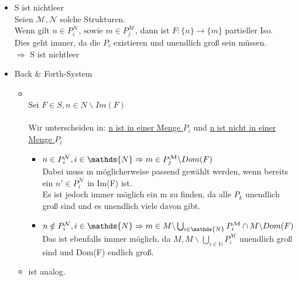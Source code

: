 \documentclass[a4paper]{scrartcl}%
\begin{document}
\begin{itemize}
            \begin{itemize}
                \item S ist nichtleer\\
                    Seien $\mathcal{M}, \mathcal{N}$ solche Strukturen.\\
                    Wenn gilt $n \in P_i^\mathcal{N} \text{, sowie } m \in P_j^\mathcal{M}$, dann ist $F: \{n\} \rightarrow \{m\}$ partieller Iso.\\
                    Dies geht immer, da die $P_i$ existieren und unendlich groß sein müssen.\\
                    $\Rightarrow$ S ist nichtleer\\
                \item Back \& Forth-System\\
                    \begin{itemize}
                        \item {}\\
                            Sei $F \in S, n \in N\backslash Im(F)$\\
                            \\Wir unterscheiden in: \underline{n ist in einer Menge $P_i$} und \underline{n ist nicht in einer Menge $P_i$}\\
                            \begin{itemize}
                                \item $n \in P_i^\mathcal{N}, i \in \mathds{N}\\
                                    \Rightarrow m \in P_j^\mathcal{M} \backslash Dom(F)$\\
                                    Dabei muss m möglicherweise passend gewählt werden, wenn bereits ein $n' \in P_i^\mathcal{N}$ in Im(F) ist.\\
                                    Es ist jedoch immer möglich ein m zu finden, da alle $P_k$ unendlich groß sind und es unendlich viele davon gibt.\\
                                \item $n \notin P_i^\mathcal{N}, i \in \mathds{N}\\
                                    \Rightarrow m \in M \backslash \bigcup_{i \in \mathds{N}}P_i^\mathcal{M} \cap M \backslash Dom(F)$\\
                                    Das ist ebenfalls immer möglich, da $M, M \backslash \bigcup_{i \in \mathds{N}}P_i^\mathcal{M}$ unendlich groß sind und Dom(F) endlich groß.\\
                            \end{itemize}
                        \item {} ist analog.\\
                    \end{itemize}%
            \end{itemize}
    \end{itemize}
\end{document}
